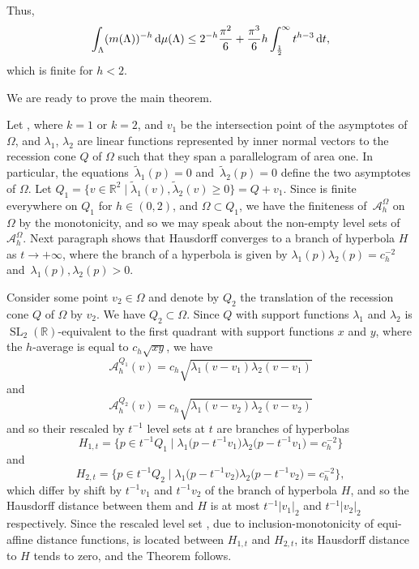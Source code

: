 \documentclass[10pt,a4paper]{amsart}
\numberwithin{equation}{section}
\theoremstyle{definition}
\begin{document}
Thus,{\samepage
\[\int_\Lambda (m(\Lambda))^{-h}\,{\rm d}\mu(\Lambda)\leq 2^{-h}\frac{\pi^2}{6}+\frac{\pi^3}{6}h\int_{\frac{1}{2}}^\infty t^{h-3} \,{\rm d}t,\]
which is finite for $h<2$.}

We are ready to prove the main theorem.

Let , where $k=1$ or $k=2$, and $v_1$ be the intersection point of the asymptotes of $\Omega$, and $\lambda_1$, $\lambda_2$ are linear functions represented by inner normal vectors to the recession cone $Q$ of $\Omega$ such that they span a parallelogram of area one. In particular, the equations~${\tilde\lambda_1(p)=0}$ and~${\tilde\lambda_2(p)=0}$ define the two asymptotes of $\Omega$. Let $Q_1=\bigl\{v\in\mathbb{R}^2\mid \tilde\lambda_1(v),\tilde\lambda_2(v)\geq 0\bigr\}=Q+v_1$. Since  is finite everywhere on $Q_1$ for $h\in(0,2)$, and $\Omega\subset Q_1$, we have the finiteness of~$\mathcal{A}^{\Omega}_h$ on $\Omega$ by the monotonicity, and so we may speak about the non-empty level sets of~$\mathcal{A}^{\Omega}_h$. Next paragraph shows that  Hausdorff converges to a branch of hyperbola $H$ as $t\rightarrow+\infty$, where the branch of a hyperbola is given by $\lambda_1(p)\lambda_2(p)=c_h^{-2}$ and~${\lambda_1(p),\lambda_2(p)>0}$.

Consider some point $v_2\in\Omega$ and denote by $Q_2$ the translation of the recession cone $Q$ of $\Omega$ by $v_2$. We have $Q_2\subset\Omega$. Since $Q$ with support functions $\lambda_1$ and $\lambda_2$ is $\operatorname{SL}_2(\mathbb{R})$-equivalent to the first quadrant  with support functions $x$ and $y$, where the $h$-average is equal to $c_h\sqrt{xy}$, we have
\[
\mathcal{A}^{Q_1}_h(v)=c_h\sqrt{\lambda_1(v-v_1)\lambda_2(v-v_1)}
\]
and
\[
\mathcal{A}^{Q_2}_h(v)=c_h\sqrt{\lambda_1(v-v_2)\lambda_2(v-v_2)}
\]
and so their rescaled by $t^{-1}$ level sets at $t$ are branches of hyperbolas
\[
H_{1,t}=\bigl\{p\in t^{-1}Q_1\mid \lambda_1\bigl(p-t^{-1}v_1\bigr)\lambda_2\bigl(p-t^{-1}v_1\bigr)=c_h^{-2}\bigr\}
\]
and
\[
H_{2,t}=\bigl\{p\in t^{-1}Q_2\mid \lambda_1\bigl(p-t^{-1}v_2\bigr)\lambda_2\bigl(p-t^{-1}v_2\bigr)=c_h^{-2}\bigr\},
\]
which differ by shift by $t^{-1}v_1$ and $t^{-1}v_2$ of the branch of hyperbola $H$, and so the Hausdorff distance between them and $H$ is at most $t^{-1}|v_1|_2$ and $t^{-1}|v_2|_2$ respectively. Since the rescaled level set , due to inclusion-monotonicity of equi-affine distance functions, is located between $H_{1,t}$ and $H_{2,t}$, its Hausdorff distance to $H$ tends to zero, and the Theorem follows.
\end{document}
